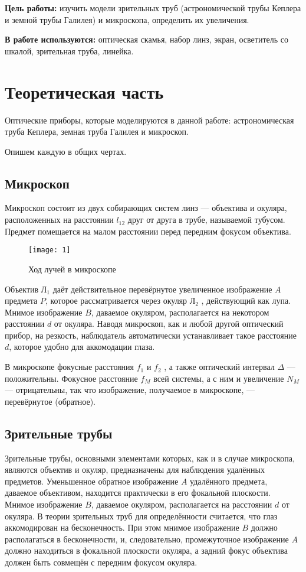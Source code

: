 \documentclass{letask}
\begin{document}


\textbf{Цель работы:} изучить модели зрительных труб (астрономической трубы Кеплера и земной трубы Галилея) и микроскопа, определить их увеличения.

\textbf{В работе используются:} оптическая скамья, набор линз, экран, осветитель со шкалой, зрительная труба, линейка.

\section{Теоретическая часть}
Оптические приборы, которые моделируются в данной работе: астрономическая труба Кеплера, земная труба Галилея и микроскоп.

Опишем каждую в общих чертах.

\subsection{Микроскоп}

Микроскоп состоит из двух собирающих систем линз — объектива
и окуляра, расположенных на расстоянии $l_{12}$ друг от друга в трубе, называемой тубусом. Предмет помещается на малом расстоянии перед передним фокусом объектива.


\begin{figure}[H]
\centering
\texttt{[image: 1]}
\caption{Ход лучей в микроскопе}
\end{figure}

Объектив Л$_1$ даёт действительное перевёрнутое увеличенное изображение $A$ предмета $P$, которое рассматривается через окуляр Л$_2$ , действующий как лупа. Мнимое изображение $B$, даваемое окуляром, располагается на некотором расстоянии $d$ от окуляра. Наводя микроскоп,
как и любой другой оптический прибор, на резкость, наблюдатель автоматически устанавливает такое расстояние $d$, которое удобно для аккомодации глаза.

В микроскопе фокусные расстояния $f_1$ и $f_2$ , а также оптический интервал $\Delta$ — положительны. Фокусное расстояние $f_M$ всей системы, а с
ним и увеличение $N_M$ — отрицательны, так что изображение, получаемое в микроскопе, — перевёрнутое (обратное).

\subsection{Зрительные трубы}

Зрительные трубы, основными элементами которых, как и в случае
микроскопа, являются объектив и окуляр, предназначены для наблюдения удалённых предметов.
Уменьшенное обратное изображение $A$
удалённого предмета, даваемое объективом, находится практически в
его фокальной плоскости. Мнимое изображение $B$, даваемое окуляром,
располагается на расстоянии $d$ от окуляра.
В теории зрительных труб для определённости считается, что глаз аккомодирован на бесконечность. При этом мнимое изображение $B$ должно располагаться в бесконечности, и, следовательно, промежуточное
изображение $A$ должно находиться в фокальной плоскости окуляра, а
задний фокус объектива должен быть совмещён с передним фокусом
окуляра.
\end{document}
